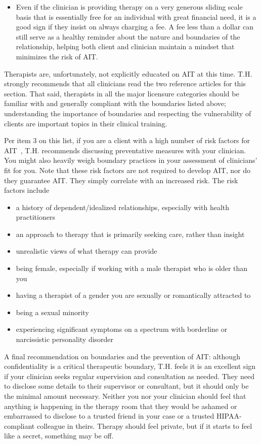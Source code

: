 \documentclass[11pt,oneside]{book}
\let\cite\parencite
\begin{document}
\begin{itemize}
    \item Even if the clinician is providing therapy on a very generous sliding scale basis that is essentially free for an individual with great financial need, it is a good sign if they insist on always charging a fee. A fee less than a dollar can still serve as a healthy reminder about the nature and boundaries of the relationship, helping both client and clinician maintain a mindset that minimizes the risk of AIT.
\end{itemize}

Therapists are, unfortunately, not explicitly educated on AIT at this time. T.H. strongly recommends that all clinicians read the two reference articles for this section. That said, therapists in all the major licensure categories should be familiar with and generally compliant with the boundaries listed above; understanding the importance of boundaries and respecting the vulnerability of clients are important topics in their clinical training.

Per item 3 on this list, if you are a client with a high number of risk factors for AIT~\cite{transferranceLoveHarm,hook2018boundary}, T.H. recommends discussing preventative measures with your clinician. You might also heavily weigh boundary practices in your assessment of clinicians' fit for you. Note that these risk factors are not required to develop AIT, nor do they guarantee AIT. They simply correlate with an increased risk. The risk factors include
\begin{itemize}
    \item a history of dependent/idealized relationships, especially with health practitioners
    \item an approach to therapy that is primarily seeking care, rather than insight
    \item unrealistic views of what therapy can provide
    \item being female, especially if working with a male therapist who is older than you
    \item having a therapist of a gender you are sexually or romantically attracted to
    \item being a sexual minority
    \item experiencing significant symptoms on a spectrum with borderline or narcissistic personality disorder
\end{itemize}

A final recommendation on boundaries and the prevention of AIT: although confidentiality is a critical therapeutic boundary, T.H. feels it is an excellent sign if your clinician seeks regular supervision and consultation as needed. They need to disclose some details to their supervisor or consultant, but it should only be the minimal amount necessary. Neither you nor your clinician should feel that anything is happening in the therapy room that they would be ashamed or embarrassed to disclose to a trusted friend in your case or a trusted HIPAA-compliant colleague in theirs. Therapy should feel private, but if it starts to feel like a secret, something may be off.
\end{document}
